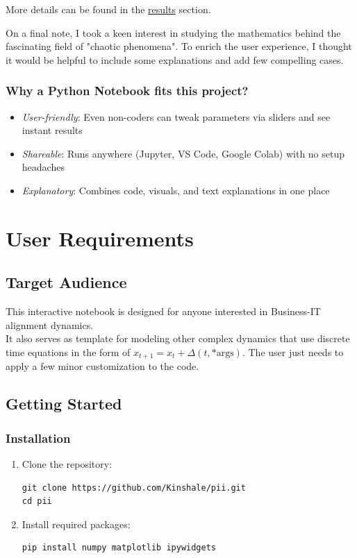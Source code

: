 \documentclass[a4paper, 10pt]{article}
\begin{document}
More details can be found in the \hyperref[sec:results]{results} section.

On a final note, I took a keen interest in studying the mathematics behind the fascinating field of "chaotic phenomena". 
To enrich the user experience, I thought it would be helpful to include some explanations and add few compelling cases.

\subsubsection*{Why a Python Notebook fits this project?}

\begin{itemize}
    \item \textit{User-friendly}: Even non-coders can tweak parameters via sliders and see instant results
    \item \textit{Shareable}: Runs anywhere (Jupyter, VS Code, Google Colab) with no setup headaches
    \item \textit{Explanatory}: Combines code, visuals, and text explanations in one place
\end{itemize}

\section{User Requirements}
\subsection{Target Audience}
This interactive notebook is designed for anyone interested in Business-IT alignment dynamics. \\
It also serves as template for modeling other complex dynamics that use discrete time equations in the form of $x_{t+1} = x_t + \Delta(t, \text{*args})$. The user just needs to apply a few minor customization to the code.

\subsection{Getting Started}
\subsubsection{Installation}
\begin{enumerate}
    \item Clone the repository:
    \begin{lstlisting}[style=bashstyle]
git clone https://github.com/Kinshale/pii.git
cd pii
    \end{lstlisting}

    \item Install required packages:
    \begin{lstlisting}[style=bashstyle]
pip install numpy matplotlib ipywidgets
    \end{lstlisting}
\end{enumerate}
\end{document}
